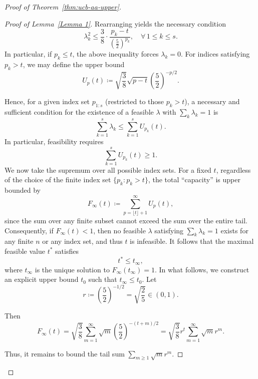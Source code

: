 \documentclass[11pt]{article}
\begin{document}
\begin{proof}[Proof of Theorem~\ref{thm:ucb-aa-upper}]
\begin{itemize}
\begin{itemize}
\begin{proof}[Proof of Lemma~\ref{Lemma 1}]
Rearranging yields the necessary condition
\[
\lambda_k^2 \leq \frac{3}{8} \cdot \frac{p_k - t}{\left( \frac{5}{2} \right)^{p_k}}, \quad \forall\, 1\leq k\leq s.
\]
In particular, if \( p_k \leq t \), the above inequality forces \( \lambda_k = 0 \). For indices satisfying \( p_k > t \), we may define the upper bound
\[
U_p(t) \coloneqq \sqrt{\frac{3}{8}} \sqrt{p - t} \left( \frac{5}{2} \right)^{-p/2}.
\]

Hence, for a given index set \( p_{1:s} \) (restricted to those \( p_k > t \)), a necessary and sufficient condition for the existence of a feasible \( \lambda \) with \( \sum_k \lambda_k = 1 \) is
\[
\sum_{k=1}^s \lambda_k \leq \sum_{k=1}^s U_{p_k}(t).
\]
In particular, feasibility requires
\[
\sum_{k=1}^s U_{p_k}(t) \geq 1.
\]
We now take the supremum over all possible index sets. For a fixed \( t \), regardless of the choice of the finite index set \( \{p_k : p_k > t\} \), the total ``capacity'' is upper bounded by
\[
F_\infty(t) \coloneqq \sum_{p = \lfloor t \rfloor + 1}^\infty U_p(t),
\]
since the sum over any finite subset cannot exceed the sum over the entire tail. Consequently, if \( F_\infty(t) < 1 \), then no feasible \( \lambda \) satisfying \( \sum_k \lambda_k = 1 \) exists for any finite \( n \) or any index set, and thus \( t \) is infeasible. It follows that the maximal feasible value \( t^* \) satisfies
\[
t^* \leq t_\infty,
\]
where \( t_\infty \) is the unique solution to \( F_\infty(t_\infty) = 1 \). In what follows, we construct an explicit upper bound \( t_0 \) such that \( t_\infty \leq t_0 \). Let
\[
r \coloneqq \left( \frac{5}{2} \right)^{-1/2} = \sqrt{\frac{2}{5}} \in (0,1).
\]

Then
\[
F_\infty(t) = \sqrt{\frac{3}{8}} \sum_{m=1}^\infty \sqrt{m} \left( \frac{5}{2} \right)^{-(t+m)/2} = \sqrt{\frac{3}{8}} r^t \sum_{m=1}^\infty \sqrt{m} r^m.
\]

Thus, it remains to bound the tail sum \( \sum_{m \geq 1} \sqrt{m} r^m \).


\end{proof}
\end{itemize}
\end{itemize}
\end{proof}
\end{document}
